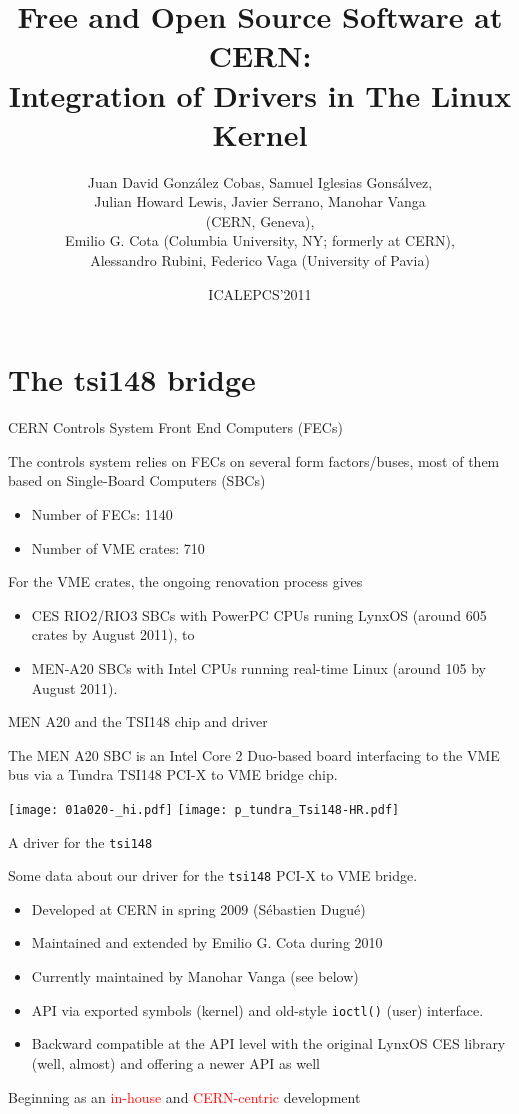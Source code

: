 \documentclass[compress,red]{beamer}
\title[FOSS at CERN: Drivers in the Kernel]%
	{Free and Open Source Software at CERN:\\
	Integration of Drivers in The Linux Kernel}
\author[David Cobas et al.]{%
	Juan David Gonz\'alez Cobas, Samuel Iglesias Gons\'alvez,\\
	Julian Howard Lewis, Javier Serrano, Manohar Vanga\\
		(CERN, Geneva),\\
	Emilio G. Cota (Columbia University, NY; formerly at CERN),\\
	Alessandro Rubini, Federico Vaga (University of Pavia)}
\date{ICALEPCS'2011}
\begin{document}
\begin{frame}
\titlepage
\end{frame}

\section{The tsi148 bridge}
\begin{frame}{CERN Controls System Front End Computers (FECs)}

The controls system relies on FECs on several form factors/buses,
most of them based on Single-Board Computers (SBCs)

\begin{itemize}
\item Number of FECs: 1140
\item Number of VME crates: 710
\end{itemize}

For the VME crates, the ongoing renovation process gives
\begin{itemize}
\item CES RIO2/RIO3 SBCs with PowerPC CPUs runing
LynxOS (around 605 crates by August 2011), to
\item MEN-A20 SBCs with Intel CPUs running real-time
Linux (around 105 by August 2011).
\end{itemize}
\end{frame}


\begin{frame}{MEN A20 and the TSI148 chip and driver}

The MEN A20 SBC is an Intel Core 2 Duo-based board interfacing to the
VME bus via a Tundra TSI148 PCI-X to VME bridge chip.

\begin{center}
\texttt{[image: 01a020-\_hi.pdf]} \qquad
\texttt{[image: p\_tundra\_Tsi148-HR.pdf]}
\end{center}
\end{frame}

\begin{frame}{A driver for the \texttt{tsi148}}

Some data about our driver for the \texttt{tsi148} PCI-X to VME bridge.
\begin{itemize}
\item<1-> Developed at CERN in spring 2009 (S\'ebastien Dugu\'e)
\item<2-> Maintained and extended by Emilio G. Cota during 2010
\item<3-> Currently maintained by Manohar Vanga (see below)
\item<4-> API via exported symbols (kernel) and old-style \texttt{ioctl()} (user) interface.
\item<5-> Backward compatible at the API level with the original LynxOS CES
    library (well, almost) and offering a newer API as well
\end{itemize}

 Beginning as an \textcolor{red}{in-house}
and \textcolor{red}{CERN-centric} development
\end{frame}
\end{document}
